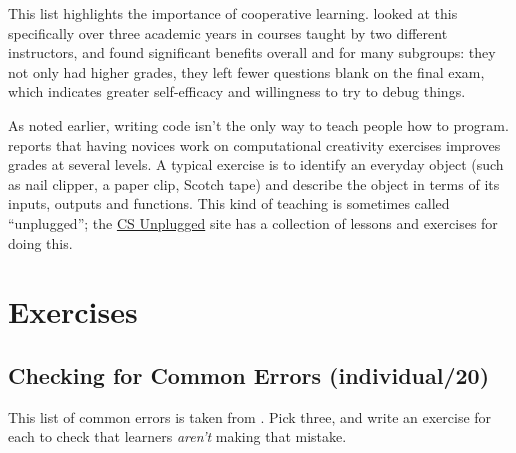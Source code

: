 This list highlights the importance of cooperative learning.
\cite{Beck2013} looked at this specifically over three academic years
in courses taught by two different instructors, and found significant
benefits overall and for many subgroups: they not only had higher
grades, they left fewer questions blank on the final exam, which
indicates greater self-efficacy and willingness to try to debug things.

As noted earlier, writing code isn't the only way to teach people how
to program. \cite{Shel2017} reports that having novices work on
computational creativity exercises improves grades at several
levels. A typical exercise is to identify an everyday object (such as
nail clipper, a paper clip, Scotch tape) and describe the object in
terms of its inputs, outputs and functions. This kind of teaching is
sometimes called ``unplugged''; the \href{https://csunplugged.org/en/}{CS Unplugged} site
has a collection of lessons and exercises for doing this.

\section{Exercises}\label{s:pck-exercises}

\subsection{Checking for Common Errors (individual/20)}\label{checking-for-common-errors-individual20}

This list of common errors is taken from \cite{Sirk2012}. Pick three,
and write an exercise for each to check that learners \emph{aren't} making
that mistake.

